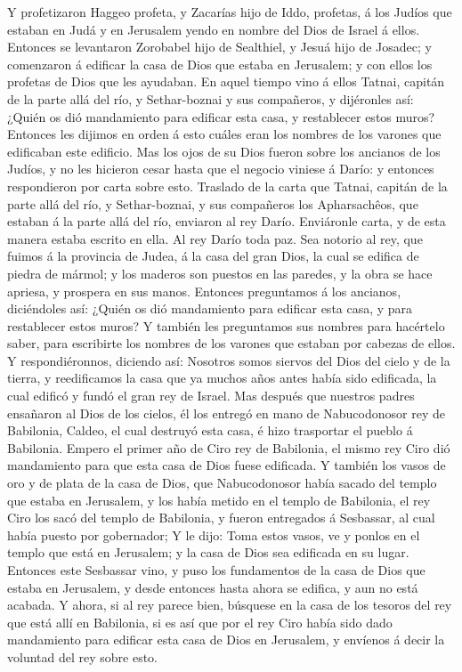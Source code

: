  Y profetizaron Haggeo profeta, y Zacarías hijo de Iddo,
profetas, á los Judíos que estaban en Judá y en Jerusalem yendo en
nombre del Dios de Israel á ellos.  Entonces se levantaron
Zorobabel hijo de Sealthiel, y Jesuá hijo de Josadec; y comenzaron á
edificar la casa de Dios que estaba en Jerusalem; y con ellos los
profetas de Dios que les ayudaban.  En aquel tiempo vino á
ellos Tatnai, capitán de la parte allá del río, y Sethar-boznai y sus
compañeros, y dijéronles así: ¿Quién os dió mandamiento para edificar
esta casa, y restablecer estos muros?  Entonces les
dijimos en orden á esto cuáles eran los nombres de los varones que
edificaban este edificio.  Mas los ojos de su Dios fueron
sobre los ancianos de los Judíos, y no les hicieron cesar hasta que el
negocio viniese á Darío: y entonces respondieron por carta sobre esto.
 Traslado de la carta que Tatnai, capitán de la parte allá
del río, y Sethar-boznai, y sus compañeros los Apharsachêos, que estaban
á la parte allá del río, enviaron al rey Darío. 
Enviáronle carta, y de esta manera estaba escrito en ella. Al rey Darío
toda paz.  Sea notorio al rey, que fuimos á la provincia
de Judea, á la casa del gran Dios, la cual se edifica de piedra de
mármol; y los maderos son puestos en las paredes, y la obra se hace
apriesa, y prospera en sus manos.  Entonces preguntamos á
los ancianos, diciéndoles así: ¿Quién os dió mandamiento para edificar
esta casa, y para restablecer estos muros?  Y también les
preguntamos sus nombres para hacértelo saber, para escribirte los
nombres de los varones que estaban por cabezas de ellos. 
Y respondiéronnos, diciendo así: Nosotros somos siervos del Dios del
cielo y de la tierra, y reedificamos la casa que ya muchos años antes
había sido edificada, la cual edificó y fundó el gran rey de Israel.
 Mas después que nuestros padres ensañaron al Dios de los
cielos, él los entregó en mano de Nabucodonosor rey de Babilonia,
Caldeo, el cual destruyó esta casa, é hizo trasportar el pueblo á
Babilonia.  Empero el primer año de Ciro rey de
Babilonia, el mismo rey Ciro dió mandamiento para que esta casa de Dios
fuese edificada.  Y también los vasos de oro y de plata
de la casa de Dios, que Nabucodonosor había sacado del templo que estaba
en Jerusalem, y los había metido en el templo de Babilonia, el rey Ciro
los sacó del templo de Babilonia, y fueron entregados á Sesbassar, al
cual había puesto por gobernador;  Y le dijo: Toma estos
vasos, ve y ponlos en el templo que está en Jerusalem; y la casa de Dios
sea edificada en su lugar.  Entonces este Sesbassar vino,
y puso los fundamentos de la casa de Dios que estaba en Jerusalem, y
desde entonces hasta ahora se edifica, y aun no está acabada.
 Y ahora, si al rey parece bien, búsquese en la casa de
los tesoros del rey que está allí en Babilonia, si es así que por el rey
Ciro había sido dado mandamiento para edificar esta casa de Dios en
Jerusalem, y envíenos á decir la voluntad del rey sobre esto.

